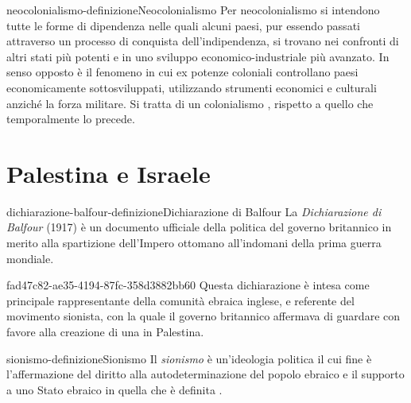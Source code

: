 \documentclass[preview]{standalone}
\begin{document}
\begin{snippetdefinition}{neocolonialismo-definizione}{Neocolonialismo}
    Per neocolonialismo si intendono tutte le forme di dipendenza nelle quali alcuni paesi,
    pur essendo passati attraverso un processo di conquista dell'indipendenza,
    si trovano nei confronti di altri stati più potenti e in uno
    sviluppo economico-industriale più avanzato.
    In senso opposto è il fenomeno in cui ex potenze coloniali controllano paesi
    economicamente sottosviluppati, utilizzando strumenti economici e
    culturali anziché la forza militare.
    Si tratta di un colonialismo ,
    rispetto a quello  che temporalmente lo precede.
\end{snippetdefinition}



\section{Palestina e Israele}


\begin{snippetdefinition}{dichiarazione-balfour-definizione}{Dichiarazione di Balfour}
    La \textit{Dichiarazione di Balfour} (1917) è un documento ufficiale della politica del
    governo britannico in merito alla spartizione dell'Impero
    ottomano all'indomani della prima guerra mondiale.
\end{snippetdefinition}

\begin{snippet}{fad47c82-ae35-4194-87fc-358d3882bb60}
    Questa dichiarazione è intesa come principale rappresentante della
    comunità ebraica inglese, e referente del movimento
    sionista, con la quale il governo britannico affermava di guardare
    con favore alla creazione di una  in Palestina.
\end{snippet}

\begin{snippetdefinition}{sionismo-definizione}{Sionismo}
    Il \textit{sionismo} è un'ideologia politica il cui fine è l'affermazione del
    diritto alla autodeterminazione del popolo ebraico e il supporto a uno
    Stato ebraico in quella che è definita .
\end{snippetdefinition}
\end{document}
